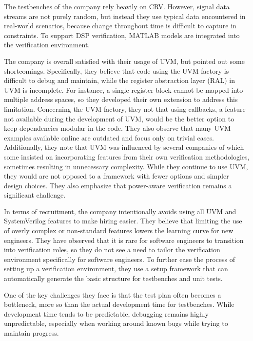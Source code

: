 \documentclass[12pt]{report}
\begin{document}
The testbenches of the company rely heavily on CRV. However, signal data streams are not purely random, but instead
they use typical data encountered in real-world scenarios, because change throughout time is difficult to capture in
constraints. To support DSP verification, MATLAB models are integrated into the verification environment.

The company is overall satisfied with their usage of UVM, but pointed out some shortcomings. Specifically, they
believe that code using the UVM factory is difficult to debug and maintain, while the register abstraction layer
(RAL) in UVM is incomplete. For instance, a single register block cannot be mapped into multiple address spaces, so
they developed their own extension to address this limitation. Concerning the UVM factory, they not that using
callbacks, a feature not available during the development of UVM, would be the better option to keep dependencies
modular in the code. They also observe that many UVM examples available online are outdated and focus only on trivial
cases. Additionally, they note that UVM was influenced by several companies of which some insisted on incorporating
features from their own verification methodologies, sometimes resulting in unnecessary complexity. While they
continue to use UVM, they would are not opposed to a framework with fewer options and simpler design choices. They
also emphasize that power-aware verification remains a significant challenge.

In terms of recruitment, the company intentionally avoids using all UVM and SystemVerilog features to make hiring
easier. They believe that limiting the use of overly complex or non-standard features lowers the learning curve for
new engineers. They have observed that it is rare for software engineers to transition into verification roles, so
they do not see a need to tailor the verification environment specifically for software engineers. To further ease
the process of setting up a verification environment, they use a setup framework that can automatically generate the
basic structure for testbenches and unit tests.

One of the key challenges they face is that the test plan often becomes a bottleneck, more so than the actual
development time for testbenches. While development time tends to be predictable, debugging remains highly
unpredictable, especially when working around known bugs while trying to maintain progress.
\end{document}
